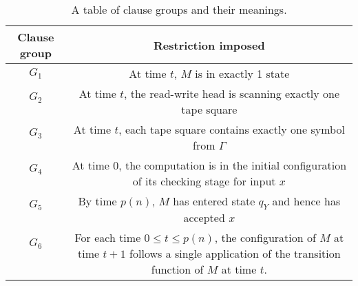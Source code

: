 \begin{table}[h]
    \begin{center}
    \begin{tabular}{|c|c|}\hline
       Clause group & Restriction imposed \\ \hline
        $G_1$ & \multirow{1}{20em}{At time $t$, $M$ is in exactly 1 state} \\
         
        $G_2$ & \multirow{2}{20em}{At time $t$, the read-write head is scanning exactly one tape square}\\ &  \\
        
        $G_3$ & \multirow{2}{20em}{At time $t$, each tape square contains exactly one symbol from $\Gamma$}\\ &  \\
        
        $G_4$ & \multirow{2}{20em}{At time $0$, the computation is in the initial configuration of its checking stage for input $x$}\\ & \\
        
        $G_5$ & \multirow{2}{20em}{By time $p(n)$, $M$ has entered state $q_Y$ and hence has accepted $x$}\\ & \\
        
        $G_6$ & \multirow{3}{20em}{For each time $0 \leq t \leq p(n)$, the configuration of $M$ at time $t+1$ follows a single application of the transition function of $M$ at time $t$.}\\ & \\ & \\ \hline
    \end{tabular}        
    \end{center}
    \caption{A table of clause groups and their meanings.}
    \label{figClauseGroups}
\end{table}